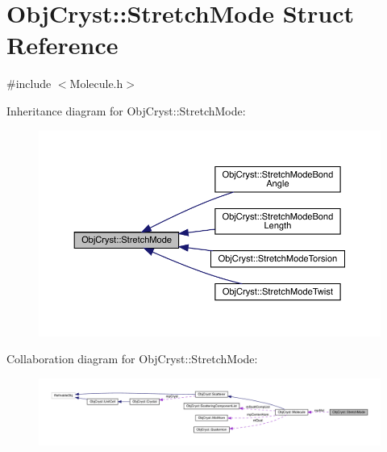 \hypertarget{struct_obj_cryst_1_1_stretch_mode}{}\section{Obj\+Cryst\+::Stretch\+Mode Struct Reference}
\label{struct_obj_cryst_1_1_stretch_mode}


{\ttfamily \#include $<$Molecule.\+h$>$}



Inheritance diagram for Obj\+Cryst\+::Stretch\+Mode\+:
\nopagebreak
\begin{figure}[H]
\begin{center}
\leavevmode
\includegraphics[width=350pt]{struct_obj_cryst_1_1_stretch_mode__inherit__graph}
\end{center}
\end{figure}


Collaboration diagram for Obj\+Cryst\+::Stretch\+Mode\+:
\nopagebreak
\begin{figure}[H]
\begin{center}
\leavevmode
\includegraphics[width=350pt]{struct_obj_cryst_1_1_stretch_mode__coll__graph}
\end{center}
\end{figure}
